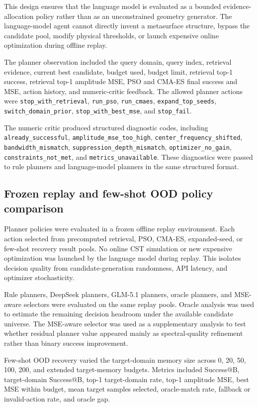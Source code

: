 \documentclass[final,1p,times]{elsarticle}
\newcommand{\code}[1]{\texttt{#1}}
\begin{document}
This design ensures that the language model is evaluated as a bounded evidence-allocation policy rather than as an unconstrained geometry generator. The language-model agent cannot directly invent a metasurface structure, bypass the candidate pool, modify physical thresholds, or launch expensive online optimization during offline replay.

The planner observation included the query domain, query index, retrieval evidence, current best candidate, budget used, budget limit, retrieval top-1 success, retrieval top-1 amplitude MSE, PSO and CMA-ES final success and MSE, action history, and numeric-critic feedback. The allowed planner actions were \code{stop\_with\_retrieval}, \code{run\_pso}, \code{run\_cmaes}, \code{expand\_top\_seeds}, \code{switch\_domain\_prior}, \code{stop\_with\_best\_mse}, and \code{stop\_fail}.

The numeric critic produced structured diagnostic codes, including \code{already\_successful}, \code{amplitude\_mse\_too\_high}, \code{center\_frequency\_shifted}, \code{bandwidth\_mismatch}, \code{suppression\_depth\_mismatch}, \code{optimizer\_no\_gain}, \code{constraints\_not\_met}, and \code{metrics\_unavailable}. These diagnostics were passed to rule planners and language-model planners in the same structured format.

\subsection{Frozen replay and few-shot OOD policy comparison}

Planner policies were evaluated in a frozen offline replay environment. Each action selected from precomputed retrieval, PSO, CMA-ES, expanded-seed, or few-shot recovery result pools. No online CST simulation or new expensive optimization was launched by the language model during replay. This isolates decision quality from candidate-generation randomness, API latency, and optimizer stochasticity.

Rule planners, DeepSeek planners, GLM-5.1 planners, oracle planners, and MSE-aware selectors were evaluated on the same replay pools. Oracle analysis was used to estimate the remaining decision headroom under the available candidate universe. The MSE-aware selector was used as a supplementary analysis to test whether residual planner value appeared mainly as spectral-quality refinement rather than binary success improvement.

Few-shot OOD recovery varied the target-domain memory size across 0, 20, 50, 100, 200, and extended target-memory budgets. Metrics included Success@B, target-domain Success@B, top-1 target-domain rate, top-1 amplitude MSE, best MSE within budget, mean target samples selected, oracle-match rate, fallback or invalid-action rate, and oracle gap.
\end{document}
